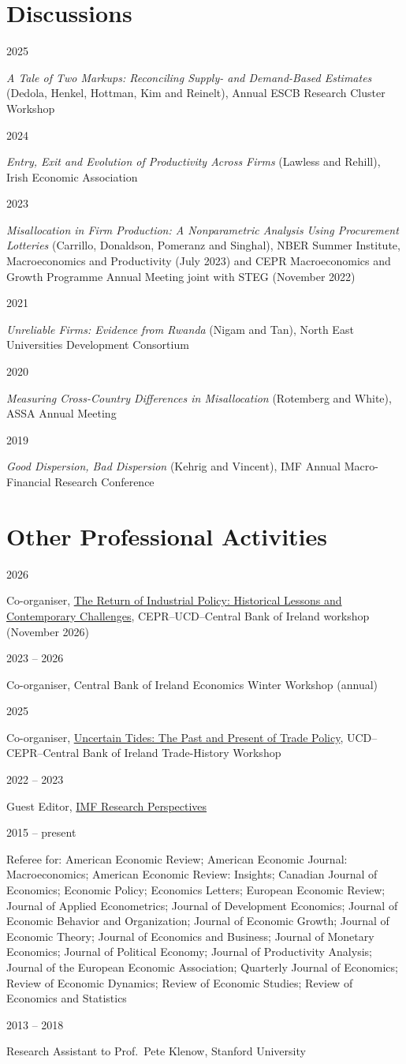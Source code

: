 \documentclass[10pt,a4paper]{article}
\let\oldsection\section
\renewcommand{\section}{\Needspace*{5\baselineskip}\oldsection}
\newlength{\yearw}\setlength{\yearw}{2.35cm}
\newcommand{\entry}[2]{%
  \par\noindent
  \begin{minipage}[t]{\yearw}\strut\color{grey}\small #1\end{minipage}%
  \hspace{0.25cm}%
  \begin{minipage}[t]{\dimexpr\textwidth-\yearw-0.25cm\relax}\strut #2\end{minipage}%
  \par\vspace{4pt}}
\begin{document}
\section*{Discussions}
\entry{2025}{\textit{A Tale of Two Markups: Reconciling Supply- and Demand-Based Estimates} (Dedola, Henkel, Hottman, Kim and Reinelt), Annual ESCB Research Cluster Workshop}
\entry{2024}{\textit{Entry, Exit and Evolution of Productivity Across Firms} (Lawless and Rehill), Irish Economic Association}
\entry{2023}{\textit{Misallocation in Firm Production: A Nonparametric Analysis Using Procurement Lotteries} (Carrillo, Donaldson, Pomeranz and Singhal), NBER Summer Institute, Macroeconomics and Productivity (July 2023) and CEPR Macroeconomics and Growth Programme Annual Meeting joint with STEG (November 2022)}
\entry{2021}{\textit{Unreliable Firms: Evidence from Rwanda} (Nigam and Tan), North East Universities Development Consortium}
\entry{2020}{\textit{Measuring Cross-Country Differences in Misallocation} (Rotemberg and White), ASSA Annual Meeting}
\entry{2019}{\textit{Good Dispersion, Bad Dispersion} (Kehrig and Vincent), IMF Annual Macro-Financial Research Conference}

\section*{Other Professional Activities}
\entry{2026}{Co-organiser, \href{https://cepr.org/events/return-industrial-policy-historical-lessons-and-contemporary-challenges}{The Return of Industrial Policy: Historical Lessons and Contemporary Challenges}, CEPR--UCD--Central Bank of Ireland workshop (November 2026)}
\entry{2023 -- 2026}{Co-organiser, Central Bank of Ireland Economics Winter Workshop (annual)}
\entry{2025}{Co-organiser, \href{https://www.centralbank.ie/events/2025/06/20/default-calendar/trade-history-workshop----uncertain-tides--the-past-and-present-of-trade-policy}{Uncertain Tides: The Past and Present of Trade Policy}, UCD--CEPR--Central Bank of Ireland Trade-History Workshop}
\entry{2022 -- 2023}{Guest Editor, \href{https://www.imf.org/en/IRB}{IMF Research Perspectives}}
\entry{2015 -- present}{Referee for: American Economic Review; American Economic Journal: Macroeconomics; American Economic Review: Insights; Canadian Journal of Economics; Economic Policy; Economics Letters; European Economic Review; Journal of Applied Econometrics; Journal of Development Economics; Journal of Economic Behavior and Organization; Journal of Economic Growth; Journal of Economic Theory; Journal of Economics and Business; Journal of Monetary Economics; Journal of Political Economy; Journal of Productivity Analysis; Journal of the European Economic Association; Quarterly Journal of Economics; Review of Economic Dynamics; Review of Economic Studies; Review of Economics and Statistics}
\entry{2013 -- 2018}{Research Assistant to Prof.\ Pete Klenow, Stanford University}
\end{document}
